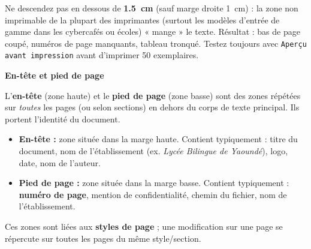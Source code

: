 \documentclass[11pt]{article}
\begin{document}
\begin{attention}
    Ne descendez pas en dessous de \textbf{\SI{1,5}{\centi\meter}} (sauf marge droite \SI{1}{\centi\meter}) : la zone non imprimable de la plupart des imprimantes (surtout les modèles d'entrée de gamme dans les cybercafés ou écoles) « mange » le texte. Résultat : bas de page coupé, numéros de page manquants, tableau tronqué. Testez toujours avec \texttt{Aperçu avant impression} avant d'imprimer 50 exemplaires.
\end{attention}

\textbf{En-tête et pied de page}\par

L'\textbf{en-tête} (zone haute) et le \textbf{pied de page} (zone basse) sont des zones répétées sur \emph{toutes} les pages (ou selon sections) en dehors du corps de texte principal. Ils portent l'identité du document.

\begin{definition}
    \begin{itemize}
        \item \textbf{En-tête :} zone située dans la marge haute. Contient typiquement : titre du document, nom de l'établissement (ex. \emph{Lycée Bilingue de Yaoundé}), logo, date, nom de l'auteur.
        \item \textbf{Pied de page :} zone située dans la marge basse. Contient typiquement : \textbf{numéro de page}, mention de confidentialité, chemin du fichier, nom de l'établissement.
    \end{itemize}
    Ces zones sont liées aux \textbf{styles de page} ; une modification sur une page se répercute sur toutes les pages du même style/section.
\end{definition}
\end{document}
